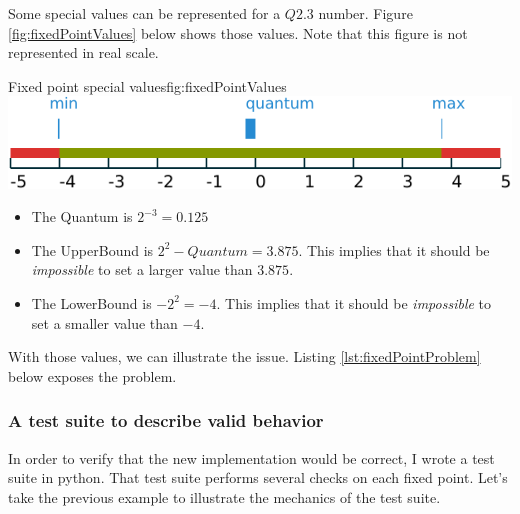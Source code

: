 Some special values can be represented for a $Q2.3$ number. Figure \ref{fig:fixedPointValues} below shows those values. Note that
this figure is not represented in real scale.
\begin{figureGraphics}{Fixed point special values}{fig:fixedPointValues}
    \includegraphics[width=\textwidth]{./src/img/fixedPoint.pdf}
\end{figureGraphics}

\begin{itemize}
    \item The Quantum is $2^{-3} = 0.125$
    \item The UpperBound is $2^2 - Quantum = 3.875$.
        This implies that it should be \emph{impossible} to set a larger value than $3.875$.
    \item The LowerBound is $-2^2 = -4$.
        This implies that it should be \emph{impossible} to set a smaller value than $-4$.
\end{itemize}

With those values, we can illustrate the issue.
Listing \ref {lst:fixedPointProblem} below exposes the problem.



\subsubsection{A test suite to describe valid behavior}

In order to verify that the new implementation would be correct, I wrote a test suite
in \gls{python}. That test suite performs several checks on each fixed point. Let's
take the previous example to illustrate the mechanics of the test suite.

